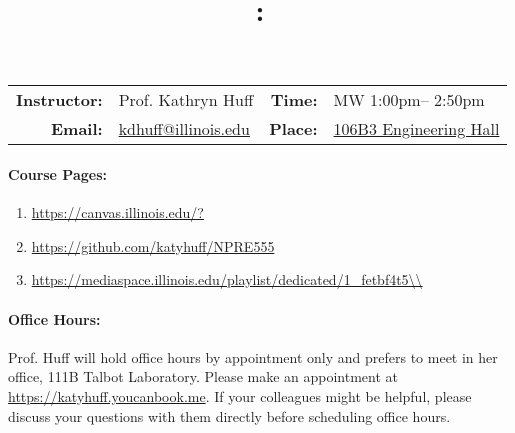 \documentclass[11pt, a4paper]{article}
\title{\CourseNumber: \CourseTitle\\}
\author{\CourseUniversity}
\date{\CourseSemester \CourseYear}
\makeatletter
\newcommand{\CourseNumber}{NPRE555}
\newcommand{\CourseDays}{MW\xspace}%
\newcommand{\CourseStart}{1:00pm\xspace}%
\newcommand{\CourseEnd}{2:50pm\xspace}%
\newcommand{\CourseInstructor}{Prof. Kathryn Huff}
\newcommand{\CourseInstructorEmail}{kdhuff@illinois.edu}
\newcommand{\CourseRoom}{\href{https://maps.app.goo.gl/mv1KTevxS3pmbSim6}{106B3 Engineering Hall}\xspace}%
\newcommand{\CourseBuilding}{\xspace}%
\newcommand{\HuffOffice}{111B Talbot Laboratory\xspace}
\newcommand{\TeachingAssistant}{TA Name\xspace}%
\newcommand{\TAOfficeHourDays}{Wednesdays\xspace}%
\newcommand{\TAOfficeHourStart}{1:00pm\xspace}%
\newcommand{\TAOfficeHourEnd}{3:00pm\xspace}%
\newcommand{\TAOfficeHourPlace}{123 Talbot Laboratory\xspace}
\makeatother
\begin{document}
\maketitle
\renewcommand{\arraystretch}{2}
\begin{center}
\begin{table}[h]
\begin{tabularx}{\textwidth}{rXrX}
\hline
\textbf{Instructor:} & \CourseInstructor & \textbf{Time:} & \CourseDays \CourseStart -- \CourseEnd \\
\textbf{Email:} &  \href{mailto:\CourseInstructorEmail}{\CourseInstructorEmail} & \textbf{Place:} & \CourseRoom \CourseBuilding\\
\hline
\end{tabularx}

\end{table}
\end{center}

\paragraph{Course Pages:}
\begin{enumerate}
        \item \url{https://canvas.illinois.edu/?}
        \item \url{https://github.com/katyhuff/\CourseNumber}
        \item \url{https://mediaspace.illinois.edu/playlist/dedicated/1_fetbf4t5\\}
\end{enumerate}


\paragraph{Office Hours:} Prof. Huff will hold office hours by appointment 
only and prefers to meet in her office, \HuffOffice. Please make an appointment at 
\url{https://katyhuff.youcanbook.me}. If your colleagues might be helpful, please 
discuss your questions with them directly before scheduling office hours.
\end{document}
